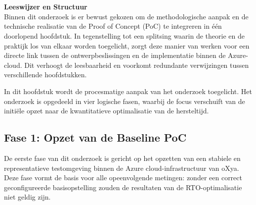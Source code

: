 
\chapter{}%
\label{ch:methodologie}


\textbf{Leeswijzer en Structuur} \\
Binnen dit onderzoek is er bewust gekozen om de methodologische aanpak en de technische realisatie van de Proof of Concept (PoC) te integreren in één doorlopend hoofdstuk. In tegenstelling tot een splitsing waarin de theorie en de praktijk los van elkaar worden toegelicht, zorgt deze manier van werken voor een directe link tussen de ontwerpbeslissingen en de implementatie binnen de Azure-cloud. Dit verhoogt de leesbaarheid en voorkomt redundante verwijzingen tussen verschillende hoofdstukken.
\medskip

In dit hoofdstuk wordt de procesmatige aanpak van het onderzoek toegelicht. Het onderzoek is opgedeeld in vier logische fasen, waarbij de focus verschuift van de initiële opzet naar de kwantitatieve optimalisatie van de hersteltijd.

\section{Fase 1: Opzet van de Baseline PoC}
De eerste fase van dit onderzoek is gericht op het opzetten van een stabiele en representatieve testomgeving binnen de Azure cloud-infrastructuur van oXya. Deze fase vormt de basis voor alle opeenvolgende metingen: zonder een correct geconfigureerde basisopstelling zouden de resultaten van de RTO-optimalisatie niet geldig zijn.
\medskip

